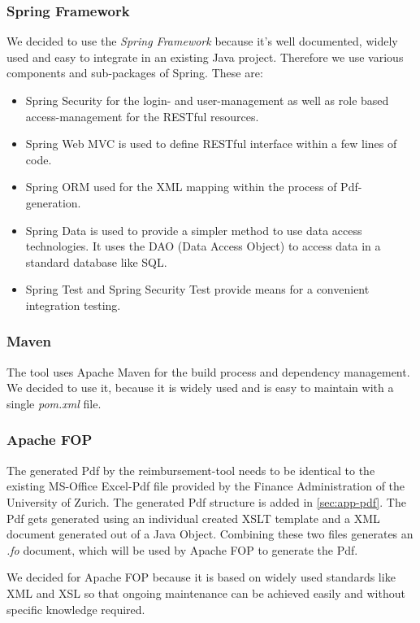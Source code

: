 \subsubsection{Spring Framework}
We decided to use the \textit{Spring Framework}\cite{spring} because it's well documented, widely used and easy to integrate in an existing Java project. Therefore we use various components and sub-packages of Spring. These are:
\begin{itemize}
	\item Spring Security for the login- and user-management as well as role based access-management for the RESTful resources.
	\item Spring Web MVC is used to define RESTful interface within a few lines of code.
	\item Spring ORM used for the XML mapping within the process of Pdf-generation.
	\item Spring Data is used to provide a simpler method to use data access technologies. It uses the DAO (Data Access Object) \cite{dao} to access data in a standard database like SQL.
	\item Spring Test and Spring Security Test provide means for a convenient integration testing.
\end{itemize}

\subsubsection{Maven}
The tool uses Apache Maven \cite{maven} for the build process and dependency management. We decided to use it, because it is widely used and is easy to maintain with a single \textit{pom.xml} file.

\subsubsection{Apache FOP}
The generated Pdf by the reimbursement-tool needs to be identical to the existing MS-Office Excel-Pdf file provided by the Finance Administration of the University of Zurich. The generated Pdf structure is added in \ref{sec:app-pdf}.\newline
The Pdf gets generated using an individual created XSLT template and a XML document generated out of a Java Object. Combining these two files generates an \textit{.fo} document, which will be used by Apache FOP \cite{apache-fop} to generate the Pdf.\par
We decided for Apache FOP because it is based on widely used standards like XML and XSL so that ongoing maintenance can be achieved easily and without specific knowledge required.

